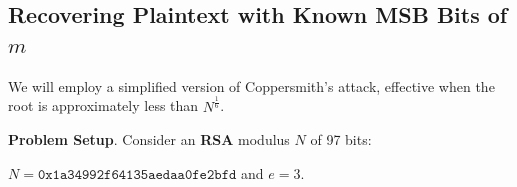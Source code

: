 \documentclass[a4paper,12pt]{report}
\begin{document}
% 
% 
% 
% 
% 
% 
% 

\subsection{Recovering Plaintext with Known MSB Bits of $m$}

We will employ a simplified version of Coppersmith's attack, effective when the root is approximately less than $N^{\frac{1}{6}}$.

\textbf{Problem Setup}. Consider an \textbf{RSA} modulus $N$ of 97 bits:

\begin{center}
    $N=\texttt{0x1a34992f64135aedaa0fe2bfd}$ and $e = 3$.
\end{center}
\end{document}
